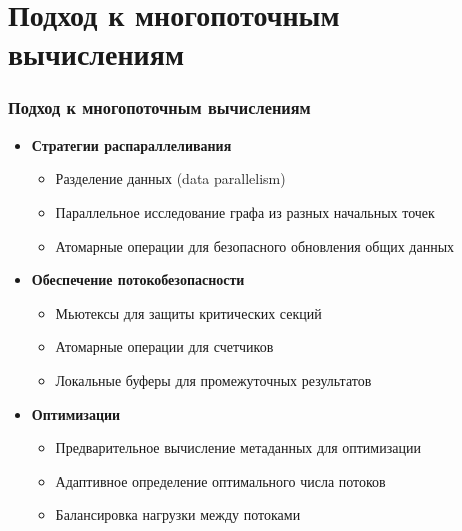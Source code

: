 \documentclass[aspectratio=169]{beamer}
\begin{document}
\section{Подход к многопоточным вычислениям}
\begin{frame}
  \frametitle{Подход к многопоточным вычислениям}
  \begin{itemize}
    \item \textbf{Стратегии распараллеливания}
      \begin{itemize}
        \item Разделение данных (data parallelism)
        \item Параллельное исследование графа из разных начальных точек
        \item Атомарные операции для безопасного обновления общих данных
      \end{itemize}
    \item \textbf{Обеспечение потокобезопасности}
      \begin{itemize}
        \item Мьютексы для защиты критических секций
        \item Атомарные операции для счетчиков
        \item Локальные буферы для промежуточных результатов
      \end{itemize}
    \item \textbf{Оптимизации}
      \begin{itemize}
        \item Предварительное вычисление метаданных для оптимизации
        \item Адаптивное определение оптимального числа потоков
        \item Балансировка нагрузки между потоками
      \end{itemize}
  \end{itemize}
\end{frame}

\end{document}

